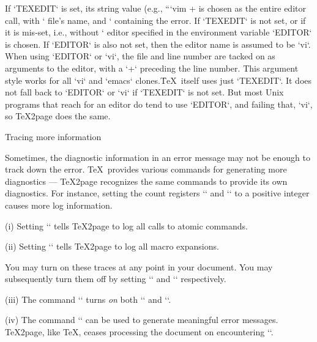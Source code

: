 If `TEXEDIT` is set, its string value (e.g.,
“`vim +%
is chosen as
the entire editor call, with `%
file’s name, and `%
containing the error.
If `TEXEDIT` is not set, or if
it is mis-set, i.e., without `%
editor specified in the environment variable `EDITOR`
is chosen.  If `EDITOR` is also not set, then
the editor name is assumed to be `vi`.
When using `EDITOR` or `vi`, the file and line number are
tacked on as arguments to the editor,
with a `+` preceding the
line number.  This argument style works for all `vi`
and `emacs` clones.\f{\TeX\ itself uses just `TEXEDIT`.
It does not fall back to `EDITOR` or `vi` if
`TEXEDIT` is not set.  But most Unix programs that
reach for an editor do tend to use `EDITOR`, and failing that,
`vi`, so \TeX2page does the same.}

\beginsection Tracing more information

%
Sometimes, the diagnostic information in an error
message may not be enough to track
down the error.
\TeX\ provides various commands for generating more diagnostics —
\TeX2page recognizes the same commands to provide its own diagnostics.
For instance,
setting the count registers
`\tracingcommands` and `\tracingmacros` to a positive integer causes
more log information.

\item(i) Setting  `` tells \TeX2page to log all calls
to atomic commands.

\item(ii) Setting  `` tells
\TeX2page to log all macro expansions.

You may turn on
these traces at any point in your document.  You may
subsequently turn them off by setting ``
and `` respectively.


\item(iii) The command `\tracingall` turns {\em on} both
`\tracingcommands` and `\tracingmacros`.


\item(iv) The command `\errmessage` can be used to generate
meaningful error messages.  \TeX2page, like \TeX, ceases
processing the document on encountering
`\errmessage`.


